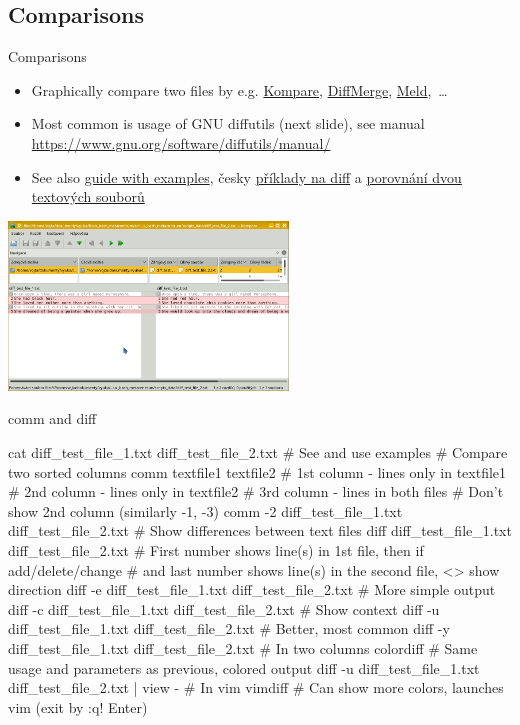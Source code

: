 \documentclass[compress, ucs, xelatex, 11pt, xcolor=svgnames,
  hyperref={
    bookmarks=true,
    unicode=true,
    colorlinks=true,
    pdftitle={Linux, command line and MetaCentrum},
    plainpages=false,
    pdfauthor={Vojtech Zeisek},
    pdfsubject={Course about use of Linux command line, writing shell scripts and using MetaCentrum of CESNET},
    pdfcreator={XeLaTeX},
    pdfkeywords={Linux, GNU, BASH, shell, command line, MetaCentrum},
    linkcolor=DarkRed,
    anchorcolor=DarkBlue,
    citecolor=Indigo,
    filecolor=NavyBlue,
    menucolor=DarkMagenta,
    urlcolor=DarkBlue,
    pdftex},
  url={hyphens, lowtilde} %
  ]{beamer}
\begin{document}
\subsection{Comparisons}

\begin{frame}{Comparisons}
  \begin{itemize}
    \item Graphically compare two files by e.g. \href{https://www.kde.org/applications/development/kompare/}{Kompare}, \href{https://sourcegear.com/diffmerge/}{DiffMerge}, \href{http://meldmerge.org/}{Meld},~\ldots
    \item Most common is usage of GNU diffutils (next slide), see manual \url{https://www.gnu.org/software/diffutils/manual/}
    \item See also \href{https://www.computerhope.com/unix/udiff.htm}{guide with examples}, česky \href{https://blog.root.cz/petrkrcmar/diff-jak-cist-vystup-z-porovnani-souboru/}{příklady na diff} a \href{https://www.root.cz/clanky/nastroje-pro-porovnani-obsahu-dvou-textovych-souboru/}{porovnání dvou textových souborů}
  \end{itemize}
  \begin{center}
    \includegraphics[height=4.5cm]{kompare.png}
  \end{center}
\end{frame}

\begin{frame}[fragile]{comm and diff}
  \begin{bashcode}
    cat diff_test_file_1.txt diff_test_file_2.txt # See and use examples
    # Compare two sorted columns
    comm textfile1 textfile2
      # 1st column - lines only in textfile1
      # 2nd column - lines only in textfile2
      # 3rd column - lines in both files
    # Don't show 2nd column (similarly -1, -3)
    comm -2 diff_test_file_1.txt diff_test_file_2.txt
    # Show differences between text files
    diff diff_test_file_1.txt diff_test_file_2.txt
      # First number shows line(s) in 1st file, then if add/delete/change
      # and last number shows line(s) in the second file, <> show direction
    diff -e diff_test_file_1.txt diff_test_file_2.txt # More simple output
    diff -c diff_test_file_1.txt diff_test_file_2.txt # Show context
    diff -u diff_test_file_1.txt diff_test_file_2.txt # Better, most common
    diff -y diff_test_file_1.txt diff_test_file_2.txt # In two columns
    colordiff # Same usage and parameters as previous, colored output
    diff -u diff_test_file_1.txt diff_test_file_2.txt | view - # In vim
    vimdiff # Can show more colors, launches vim (exit by :q! Enter)
  \end{bashcode}
\end{frame}
\end{document}
